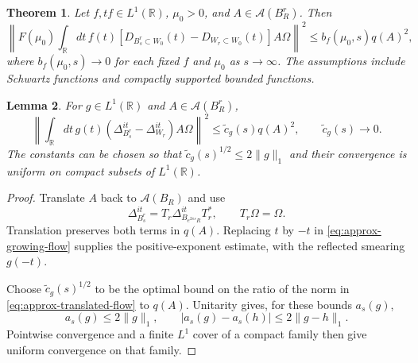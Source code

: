 \documentclass[a4paper,11pt]{article}
\newtheorem{theorem}{Theorem}
\newtheorem{lemma}[theorem]{Lemma}
\theoremstyle{definition}
\begin{document}
\begin{theorem}\label{theorem:mainresult}
Let $f,tf\in L^1(\mathbb R)$, $\mu_0>0$, and $A\in\mathcal A(B_R^r)$. Then
\begin{equation}
 \left\|F(\mu_0)\int_{\mathbb R}dt\,f(t)
 [D_{B_s^r\subset W_0}(t)-D_{W_r\subset W_0}(t)]A\Omega\right\|^2
 \leq b_f(\mu_0,s)q(A)^2,
 \label{eq:approx-characteristic-bound}
\end{equation}
where $b_f(\mu_0,s)\to0$ for each fixed $f$ and $\mu_0$ as $s\to\infty$. The assumptions include Schwartz functions and compactly supported bounded functions.
\end{theorem}

\begin{lemma}\label{lemma:extensionfredenhagen}
For $g\in L^1(\mathbb R)$ and $A\in\mathcal A(B_R^r)$,
\begin{equation}
 \left\|\int_{\mathbb R}dt\,g(t)
 (\Delta_{B_s^r}^{it}-\Delta_{W_r}^{it})A\Omega\right\|^2
 \leq\widetilde c_g(s)q(A)^2,
 \qquad \widetilde c_g(s)\longrightarrow0.
 \label{eq:approx-translated-flow}
\end{equation}
The constants can be chosen so that $\widetilde c_g(s)^{1/2}\leq2\|g\|_1$ and their convergence is uniform on compact subsets of $L^1(\mathbb R)$.
\end{lemma}
\begin{proof}
Translate $A$ back to $\mathcal A(B_R)$ and use
\[
 \Delta_{B_s^r}^{it}=T_r\Delta_{B_{e^{2\pi s}R}}^{it}T_r^*,
 \qquad T_r\Omega=\Omega.
\]
Translation preserves both terms in $q(A)$. Replacing $t$ by $-t$ in \eqref{eq:approx-growing-flow} supplies the positive-exponent estimate, with the reflected smearing $g(-t)$.

Choose $\widetilde c_g(s)^{1/2}$ to be the optimal bound on the ratio of the norm in \eqref{eq:approx-translated-flow} to $q(A)$. Unitarity gives, for these bounds $a_s(g)$,
\[
 a_s(g)\leq2\|g\|_1,
 \qquad |a_s(g)-a_s(h)|\leq2\|g-h\|_1.
\]
Pointwise convergence and a finite $L^1$ cover of a compact family then give uniform convergence on that family.
\end{proof}
\end{document}
